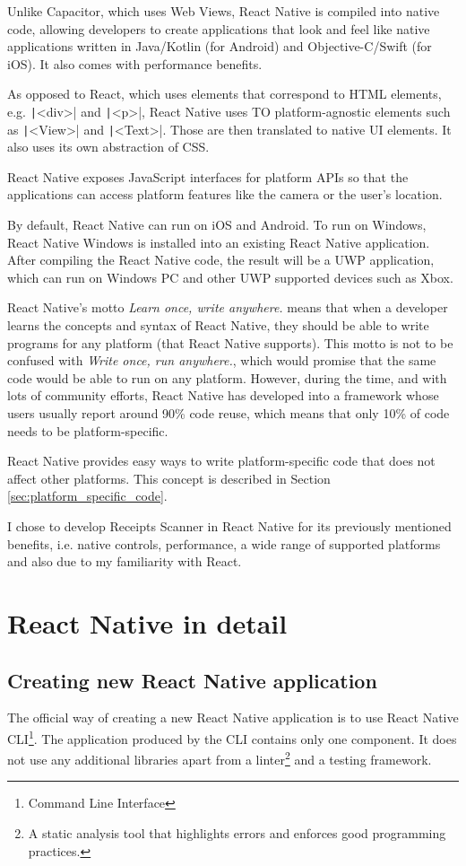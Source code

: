 \documentclass[
  digital, %
  table,   %
  oneside, %
  lof,     %
  lot,     %
]{fithesis3}
\newcommand{\code}[1]{\texttt|#1|} %
\begin{document}
Unlike Capacitor, which uses Web Views, React Native is compiled into native code, allowing developers to create applications that look and feel like native applications written in Java/Kotlin (for Android) and Objective-C/Swift (for iOS). It also comes with performance benefits. 

As opposed to React, which uses elements that correspond to HTML elements, e.g. \code{<div>} and \code{<p>}, React Native uses TO platform-agnostic elements such as \code{<View>} and \code{<Text>}. Those are then translated to native UI elements. It also uses its own abstraction of CSS.

React Native exposes JavaScript interfaces for platform APIs so that the applications can access platform features like the camera or the user’s location.

By default, React Native can run on iOS and Android. To run on Windows, React Native Windows is installed into an existing React Native application. After compiling the React Native code, the result will be a UWP application, which can run on Windows PC and other UWP supported devices such as Xbox.

React Native's motto \textit{Learn once, write anywhere.} means that when a developer learns the concepts and syntax of React Native, they should be able to write programs for any platform (that React Native supports). This motto is not to be confused with \textit{Write once, run anywhere.}, which would promise that the same code would be able to run on any platform. However, during the time, and with lots of community efforts, React Native has developed into a framework whose users usually report around 90\% code reuse, which means that only 10\% of code needs to be platform-specific. 

React Native provides easy ways to write platform-specific code that does not affect other platforms. This concept is described in Section \ref{sec:platform_specific_code}.

I chose to develop Receipts Scanner in React Native for its previously mentioned benefits, i.e. native controls, performance, a wide range of supported platforms and also due to my familiarity with React.

\chapter{React Native in detail}

\section{Creating new React Native application}
The official way of creating a new React Native application is to use React Native CLI\footnote{Command Line Interface}. The application produced by the CLI contains only one component. It does not use any additional libraries apart from a linter\footnote{A static analysis tool that highlights errors and enforces good programming practices.} and a testing framework.
\end{document}
